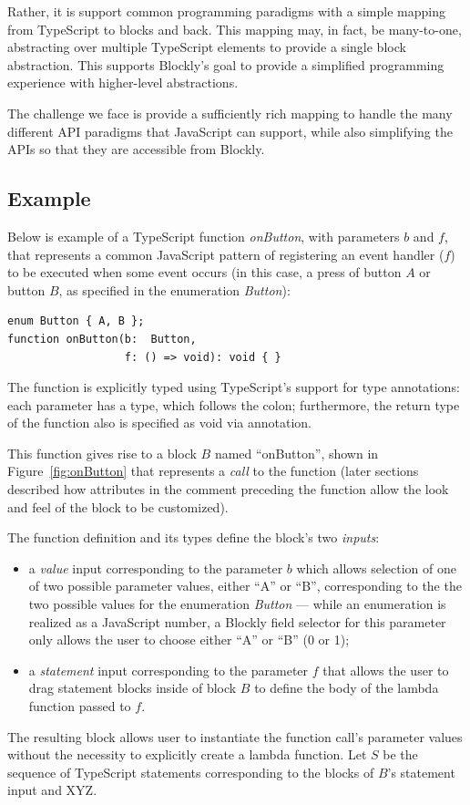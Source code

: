 Rather, it is support common programming paradigms with a simple mapping
from TypeScript to blocks and back.  This mapping may, in fact, be many-to-one, 
abstracting over multiple TypeScript elements to provide a single block abstraction.
This supports Blockly's goal to provide a simplified programming experience 
with higher-level abstractions. 

The challenge we face is provide a sufficiently rich mapping to handle the
many different API paradigms that JavaScript can support, while
also simplifying the APIs so that they are accessible from Blockly. 

\subsection{Example}

Below is example of a TypeScript function \emph{onButton},
with parameters $b$ and $f$,
that represents a common JavaScript pattern of registering an event
handler ($f$) to be executed when some event occurs (in this case, 
a press of button $A$ or button $B$, as specified in the enumeration
\emph{Button}):
\begin{lstlisting}
enum Button { A, B };
function onButton(b:  Button, 
                  f: () => void): void { }
\end{lstlisting}
The function is explicitly typed using TypeScript's support for
type annotations: each parameter has a type, which follows the colon;
furthermore, the return type of the function also is specified as void
via annotation. 

This function gives rise to a 
block $B$ named ``onButton'', shown in Figure~\ref{fig:onButton}
that represents a \emph{call} to the function
(later sections described how attributes in the comment preceding
the function allow the look and feel of the block to be customized).

The function definition and its types define the block's two \emph{inputs}:
\begin{itemize}
\item  a \emph{value} input corresponding to the parameter
$b$ which allows selection of one of two 
possible parameter values, either ``A'' or ``B'', corresponding to the
the two possible values for the enumeration \emph{Button} ---
while an enumeration is realized as a JavaScript number, a 
Blockly field selector for this parameter only allows
the user to choose either ``A'' or ``B'' (0 or 1);
\item a \emph{statement} input corresponding to the parameter $f$
that allows the user to drag statement blocks inside of block $B$
to define the body of the lambda function passed to $f$.
\end{itemize}
The resulting block allows user to instantiate the function call's
parameter values without the necessity to explicitly create a 
lambda function.  Let $S$ be the sequence of TypeScript statements
corresponding to the blocks of $B$'s statement input and XYZ. 

